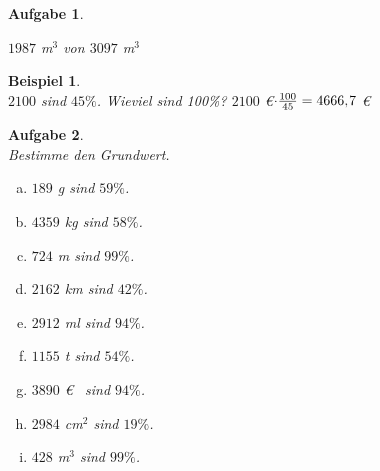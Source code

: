 \documentclass[12pt,fleqn]{article}
\theoremstyle{aufg}
\newtheorem{aufgabe}{Aufgabe}
\theoremstyle{bsp}
\newtheorem{beispiel}{Beispiel}
\begin{document}
\begin{flushleft}
\begin{aufgabe}
\begin{multicols}{3}
\begin{enumerate}[a)]
$1987$ m$^3$ von $3097$ m$^3$
\end{enumerate} 
\end{multicols} 
\end{aufgabe} 
\begin{beispiel} ~ \\ 
$2100$ sind $45\%$. Wieviel sind 100\%? $2100$ \euro$\cdot \frac{100}{45}= 4666,\hspace{-1pt}7$ \euro\end{beispiel} 
\begin{aufgabe} ~ \\ 
Bestimme den Grundwert.\begin{multicols}{3} 
\begin{enumerate}[a)] 
\item 
$189$ g sind $59\%$.
\item 
$4359$ kg sind $58\%$.
\item 
$724$ m sind $99\%$.
\item 
$2162$ km sind $42\%$.
\item 
$2912$ ml sind $94\%$.
\item 
$1155$ t sind $54\%$.
\item 
$3890$ \euro~ sind $94\%$.
\item 
$2984$ cm$^2$ sind $19\%$.
\item 
$428$ m$^3$ sind $99\%$.
\end{enumerate} 
\end{multicols} 
\end{aufgabe} 

\end{flushleft}
\end{document}

